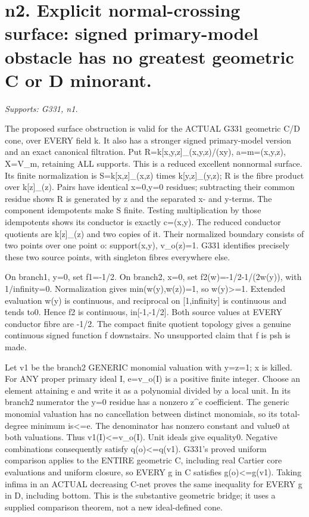 \section{n2. Explicit normal-crossing surface: signed primary-model obstacle has no greatest geometric C or D minorant.}
\textit{Supports: G331, n1.}

The proposed surface obstruction is valid for the ACTUAL G331 geometric C/D cone, over EVERY field k. It also has a stronger signed primary-model version and an exact canonical filtration. Put R=k[x,y,z]\_(x,y,z)/(xy), a=m=(x,y,z), X=V\_m, retaining ALL supports. This is a reduced excellent nonnormal surface. Its finite normalization is S=k[x,z]\_(x,z) times k[y,z]\_(y,z); R is the fibre product over k[z]\_(z). Pairs have identical x=0,y=0 residues; subtracting their common residue shows R is generated by z and the separated x- and y-terms. The component idempotents make S finite. Testing multiplication by those idempotents shows its conductor is exactly c=(x,y). The reduced conductor quotients are k[z]\_(z) and two copies of it. Their normalized boundary consists of two points over one point o: support(x,y), v\_o(z)=1. G331 identifies precisely these two source points, with singleton fibres everywhere else.

On branch1, y=0, set f1=-1/2. On branch2, x=0, set f2(w)=-1/2-1/(2w(y)), with 1/infinity=0. Normalization gives min(w(y),w(z))=1, so w(y)\textgreater{}=1. Extended evaluation w(y) is continuous, and reciprocal on [1,infinity] is continuous and tends to0. Hence f2 is continuous, in[-1,-1/2]. Both source values at EVERY conductor fibre are -1/2. The compact finite quotient topology gives a genuine continuous signed function f downstairs. No unsupported claim that f is psh is made.

Let v1 be the branch2 GENERIC monomial valuation with y=z=1; x is killed. For ANY proper primary ideal I, e=v\_o(I) is a positive finite integer. Choose an element attaining e and write it as a polynomial divided by a local unit. In its branch2 numerator the y=0 residue has a nonzero z\textasciicircum{}e coefficient. The generic monomial valuation has no cancellation between distinct monomials, so its total-degree minimum is\textless{}=e. The denominator has nonzero constant and value0 at both valuations. Thus v1(I)\textless{}=v\_o(I). Unit ideals give equality0. Negative combinations consequently satisfy q(o)\textless{}=q(v1). G331's proved uniform comparison applies to the ENTIRE geometric C, including real Cartier core evaluations and uniform closure, so EVERY g in C satisfies g(o)\textless{}=g(v1). Taking infima in an ACTUAL decreasing C-net proves the same inequality for EVERY g in D, including bottom. This is the substantive geometric bridge; it uses a supplied comparison theorem, not a new ideal-defined cone.

